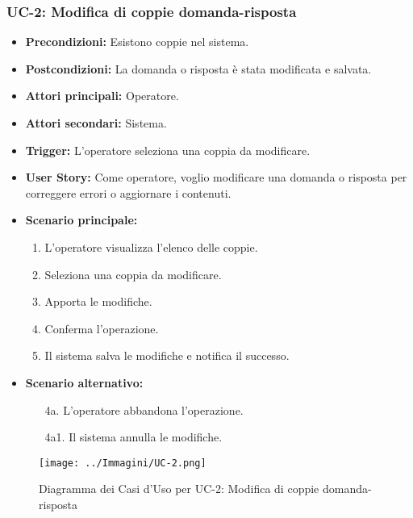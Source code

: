 \documentclass[a4paper, 12pt]{article}
\begin{document}
\subsubsection{UC-2: Modifica di coppie domanda-risposta}
\begin{itemize}
    \item \textbf{Precondizioni:} Esistono coppie nel sistema.
    \item \textbf{Postcondizioni:} La domanda o risposta è stata modificata e salvata.
    \item \textbf{Attori principali:} Operatore.
    \item \textbf{Attori secondari:} Sistema.
    \item \textbf{Trigger:} L'operatore seleziona una coppia da modificare.
    \item \textbf{User Story:} Come operatore, voglio modificare una domanda o risposta per correggere errori o aggiornare i contenuti.
    \item \textbf{Scenario principale:}
    \begin{enumerate}
        \item L'operatore visualizza l'elenco delle coppie.
        \item Seleziona una coppia da modificare.
        \item Apporta le modifiche.
        \item Conferma l'operazione.
        \item Il sistema salva le modifiche e notifica il successo.
    \end{enumerate}
    \item \textbf{Scenario alternativo:}
    \begin{enumerate}
        \item[4a.] L'operatore abbandona l'operazione.
        \item[4a1.] Il sistema annulla le modifiche.
    \end{enumerate}
\end{itemize}
\begin{figure}[hbt!]
    \centering
    \texttt{[image: ../Immagini/UC-2.png]}
    \caption{Diagramma dei Casi d'Uso per UC-2: Modifica di coppie domanda-risposta}
    \label{fig:uc1-diagram}
\end{figure}
\end{document}
